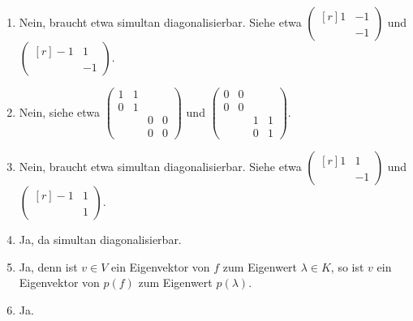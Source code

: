 \begin{solution}
  \begin{enumerate}[leftmargin=*]
    \item
      Nein, braucht etwa simultan diagonalisierbar.
      Siehe etwa
      $
        \begin{pmatrix*}[r]
          1 & -1  \\
            & -1
        \end{pmatrix*}
      $
      und
      $
        \begin{pmatrix*}[r]
          -1 &  1 \\
             & -1
        \end{pmatrix*}.
      $
    \item
      Nein, siehe etwa
      $
        \begin{pmatrix}
          1 & 1 &   &   \\
          0 & 1 &   &   \\
            &   & 0 & 0 \\
            &   & 0 & 0
        \end{pmatrix}
      $
      und
      $
        \begin{pmatrix}
          0 & 0 &   &   \\
          0 & 0 &   &   \\
            &   & 1 & 1 \\
            &   & 0 & 1
        \end{pmatrix}.
      $
    \item
      Nein, braucht etwa simultan diagonalisierbar.
      Siehe etwa
      $
        \begin{pmatrix*}[r]
          1 &  1 \\
            & -1
        \end{pmatrix*}
      $
      und
      $
        \begin{pmatrix*}[r]
          -1 & 1  \\
             & 1
        \end{pmatrix*}.
      $
    \item
      Ja, da simultan diagonalisierbar.
    \item
      Ja, denn ist $v \in V$ ein Eigenvektor von $f$ zum Eigenwert $\lambda \in K$, so ist $v$ ein Eigenvektor von $p(f)$ zum Eigenwert $p(\lambda)$.
    \item
      Ja.
  \end{enumerate}
\end{solution}


